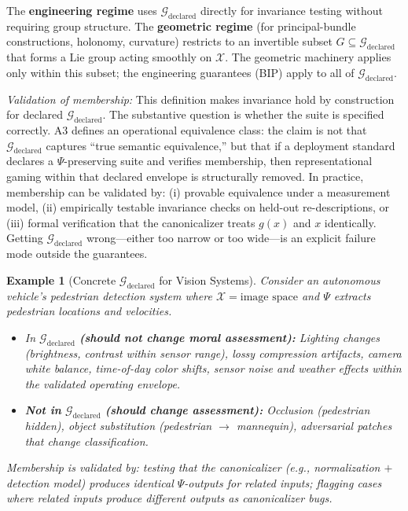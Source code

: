 \documentclass[12pt]{article}
\newtheorem{example}[theorem]{Example}
\begin{document}
The \textbf{engineering regime} uses $\mathcal{G}_{\text{declared}}$ directly for invariance testing without requiring group
structure. The \textbf{geometric regime} (for principal-bundle constructions, holonomy, curvature) restricts to an invertible subset $G \subseteq \mathcal{G}_{\text{declared}}$ that forms a Lie group acting smoothly on $\mathcal{X}$. The
geometric machinery applies only within this subset; the engineering guarantees (BIP) apply to all
of $\mathcal{G}_{\text{declared}}$.

\emph{Validation of membership:} This definition makes invariance hold by construction for declared
$\mathcal{G}_{\text{declared}}$. The substantive question is whether the suite is specified correctly. A3 defines an operational equivalence class: the claim is not that $\mathcal{G}_{\text{declared}}$ captures ``true semantic equivalence,'' but
that if a deployment standard declares a $\Psi$-preserving suite and verifies membership, then representational gaming within that declared envelope is structurally removed. In practice, membership
can be validated by: (i) provable equivalence under a measurement model, (ii) empirically testable
invariance checks on held-out re-descriptions, or (iii) formal verification that the canonicalizer treats
$g(x)$ and $x$ identically. Getting $\mathcal{G}_{\text{declared}}$ wrong---either too narrow or too wide---is an explicit failure
mode outside the guarantees.

\begin{example}[Concrete $\mathcal{G}_{\text{declared}}$ for Vision Systems]
\emph{Consider an autonomous vehicle's pedestrian
detection system where $\mathcal{X} = \text{image space}$ and $\Psi$ extracts pedestrian locations and velocities.}
\begin{itemize}
\item \emph{In} $\mathcal{G}_{\text{declared}}$ \emph{\textbf{(should not change moral assessment):}} \emph{Lighting changes (brightness, contrast within sensor range), lossy compression artifacts, camera white balance, time-of-day
color shifts, sensor noise and weather effects within the validated operating envelope.}
\item \emph{\textbf{Not in}} $\mathcal{G}_{\text{declared}}$ \emph{\textbf{(should change assessment):}} \emph{Occlusion (pedestrian hidden), object substitution (pedestrian $\to$ mannequin), adversarial patches that change classification.}
\end{itemize}

\emph{Membership is validated by: testing that the canonicalizer (e.g., normalization $+$ detection model)
produces identical $\Psi$-outputs for related inputs; flagging cases where related inputs produce different
outputs as canonicalizer bugs.}
\end{example}
\end{document}
